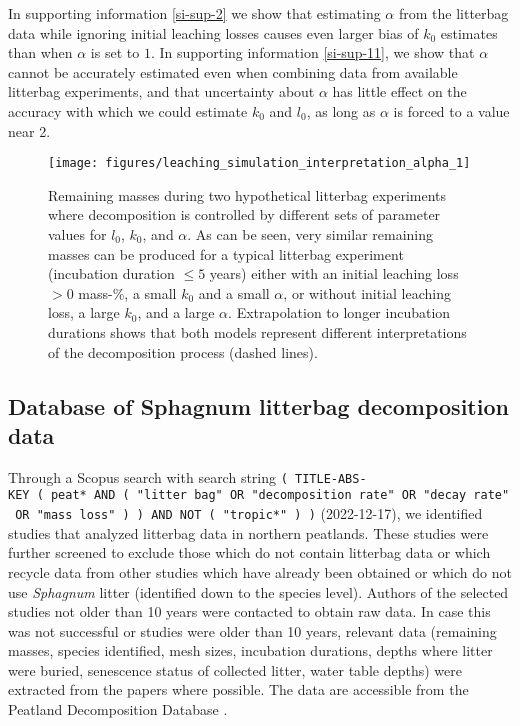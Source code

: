 \documentclass[bg, manuscript]{copernicus}
\begin{document}
In supporting information \ref{si-sup-2} we show that estimating \(\alpha\) from the litterbag data while ignoring initial leaching losses causes even larger bias of \(k_0\) estimates than when \(\alpha\) is set to \(1\). In supporting information \ref{si-sup-11}, we show that \(\alpha\) cannot be accurately estimated even when combining data from available litterbag experiments, and that uncertainty about \(\alpha\) has little effect on the accuracy with which we could estimate \(k_0\) and \(l_0\), as long as \(\alpha\) is forced to a value near 2.



\begin{figure}[H]

{\centering \texttt{[image: figures/leaching\_simulation\_interpretation\_alpha\_1]} 

}

\caption{Remaining masses during two hypothetical litterbag experiments where decomposition is controlled by different sets of parameter values for \(l_0\), \(k_0\), and \(\alpha\). As can be seen, very similar remaining masses can be produced for a typical litterbag experiment (incubation duration \(\le5\) years) either with an initial leaching loss \(>0\) mass-\%, a small \(k_0\) and a small \(\alpha\), or without initial leaching loss, a large \(k_0\), and a large \(\alpha\). Extrapolation to longer incubation durations shows that both models represent different interpretations of the decomposition process (dashed lines).}\label{fig:out-leaching-sim-interpretation-alpha}
\end{figure}

\subsection{Database of Sphagnum litterbag decomposition data}

Through a Scopus search with search string \texttt{(\ TITLE-ABS-KEY\ (\ peat*\ AND\ (\ "litter\ bag"\ OR\ "decomposition\ rate"\ OR\ "decay\ rate"\ OR\ "mass\ loss"\ )\ )\ AND\ NOT\ (\ "tropic*"\ )\ )} (2022-12-17), we identified studies that analyzed litterbag data in northern peatlands. These studies were further screened to exclude those which do not contain litterbag data or which recycle data from other studies which have already been obtained or which do not use \emph{Sphagnum} litter (identified down to the species level). Authors of the selected studies not older than 10 years were contacted to obtain raw data. In case this was not successful or studies were older than 10 years, relevant data (remaining masses, species identified, mesh sizes, incubation durations, depths where litter were buried, senescence status of collected litter, water table depths) were extracted from the papers where possible. The data are accessible from the Peatland Decomposition Database \citep{Teickner.2024c}.
\end{document}
